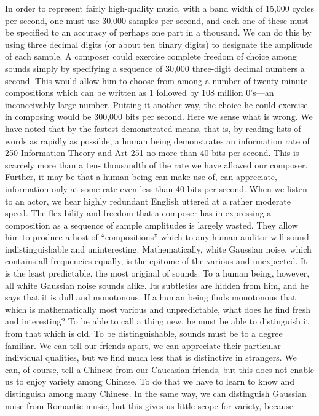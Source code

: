 {{{{{{{{{{{{In order to represent fairly high-quality music, with a band
width of 15,000 cycles per second, one must use 30,000 samples
per second, and each one of these must be specified to an accuracy
of perhaps one part in a thousand. We can do this by using three
decimal digits (or about ten binary digits) to designate the amplitude
of each sample.
A composer could exercise complete freedom of choice among
sounds simply by specifying a sequence of 30,000 three-digit decimal
numbers a second. This would allow him to choose from
among a number of twenty-minute compositions which can be
written as 1 followed by 108 million 0’s—an inconceivably large
number. Putting it another way, the choice he could exercise in
composing would be 300,000 bits per second.
Here we sense what is wrong. We have noted that by the fastest
demonstrated means, that is, by reading lists of words as rapidly
as possible, a human being demonstrates an information rate of
250
Information Theory and Art 251
no more than 40 bits per second. This is scarcely more than a ten-
thousandth of the rate we have allowed our composer.
Further, it may be that a human being can make use of, can
appreciate, information only at some rate even less than 40 bits
per second. When we listen to an actor, we hear highly redundant
English uttered at a rather moderate speed.
The flexibility and freedom that a composer has in expressing a
composition as a sequence of sample amplitudes is largely wasted.
They allow him to produce a host of “compositions” which to any
human auditor will sound indistinguishable and uninteresting.
Mathematically, white Gaussian noise, which contains all frequencies
equally, is the epitome of the various and unexpected. It is
the least predictable, the most original of sounds. To a human
being, however, all white Gaussian noise sounds alike. Its subtleties
are hidden from him, and he says that it is dull and monotonous.
If a human being finds monotonous that which is mathematically
most various and unpredictable, what does he find fresh and
interesting? To be able to call a thing new, he must be able to
distinguish it from that which is old. To be distinguishable, sounds
must be to a degree familiar.
We can tell our friends apart, we can appreciate their particular
individual qualities, but we find much less that is distinctive in
strangers. We can, of course, tell a Chinese from our Caucasian
friends, but this does not enable us to enjoy variety among Chinese.
To do that we have to learn to know and distinguish among many
Chinese. In the same way, we can distinguish Gaussian noise from
Romantic music, but this gives us little scope for variety, because
}}}}}}}}}}}}
